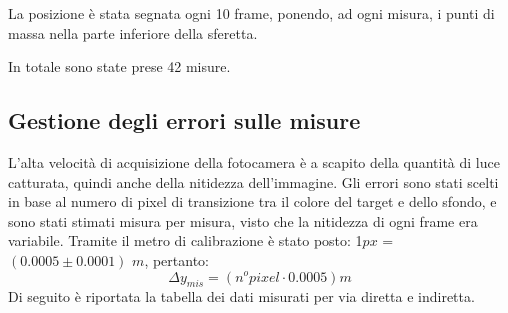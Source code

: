 \documentclass[12pt, a4paper]{article}
\begin{document}
La posizione è stata segnata ogni 10 frame, ponendo, ad ogni misura, i punti di massa nella parte inferiore della sferetta. 

In totale sono state prese 42 misure.


\subsection{Gestione degli errori sulle misure}
L'alta velocità di acquisizione della fotocamera è a scapito della quantità di luce catturata, quindi anche della nitidezza dell'immagine.
Gli errori sono stati scelti in base al numero di pixel di transizione tra il colore del target e dello sfondo, e sono stati stimati misura per misura, visto che la nitidezza di ogni frame era variabile. Tramite il metro di calibrazione è stato posto: 1$px$ = $(0.0005\pm 0.0001)$ $m$, pertanto:
\begin{equation*}
    \Delta y_{mis}= (n^o pixel \cdot 0.0005)m
\end{equation*}
Di seguito è riportata la tabella dei dati misurati per via diretta e indiretta.
\newpage
\end{document}
